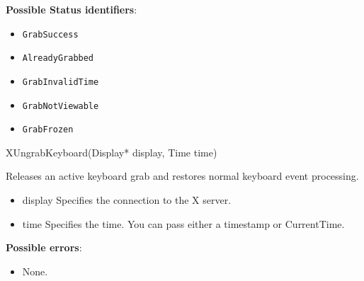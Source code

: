 \documentclass{report}
\begin{document}
\begin{itemize}
        \textbf{Possible Status identifiers}:
        \begin{itemize}
            \item \texttt{GrabSuccess}
            \item \texttt{AlreadyGrabbed}
            \item \texttt{GrabInvalidTime}
            \item \texttt{GrabNotViewable}
            \item \texttt{GrabFrozen}
        \end{itemize}

        \begin{cppcode}
        XUngrabKeyboard(Display* display, Time time)
        \end{cppcode}
        \bigbreak \noindent
        Releases an active keyboard grab and restores normal keyboard event processing.

        \begin{itemize}
            \item display Specifies the connection to the X server.
            \item time Specifies the time. You can pass either a timestamp or CurrentTime.
        \end{itemize}

        \textbf{Possible errors}:
        \begin{itemize}
            \item None.
        \end{itemize}


\end{itemize}
\end{document}
